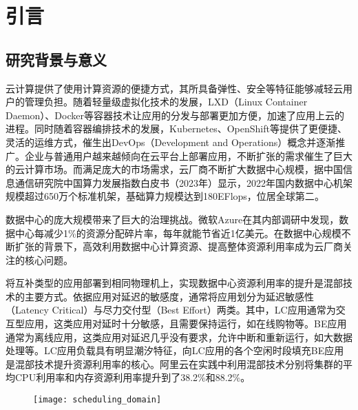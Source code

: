 \chapter{引言}\label{chap:introduction}

\section{研究背景与意义}


云计算提供了使用计算资源的便捷方式，其所具备弹性、安全等特征能够减轻云用户的管理负担。随着轻量级虚拟化技术的发展，LXD（Linux Container Daemon）、Docker等容器技术让应用的分发与部署更加方便，加速了应用上云的进程。同时随着容器编排技术的发展，Kubernetes、OpenShift等提供了更便捷、灵活的运维方式，催生出DevOps（Development and Operations）概念并逐渐推广。企业与普通用户越来越倾向在云平台上部署应用，不断扩张的需求催生了巨大的云计算市场。而满足庞大的市场需求，云厂商不断扩大数据中心规模，据中国信息通信研究院中国算力发展指数白皮书（2023年）显示，2022年国内数据中心机架规模超过650万个标准机架，基础算力规模达到180EFlops，位居全球第二\citep{chinaict2023}。

数据中心的庞大规模带来了巨大的治理挑战。微软Azure在其内部调研中发现，数据中心每减少1\%的资源分配碎片率，每年就能节省近1亿美元\citep{hadary2020protean}。在数据中心规模不断扩张的背景下，高效利用数据中心计算资源、提高整体资源利用率成为云厂商关注的核心问题。

将互补类型的应用部署到相同物理机上，实现数据中心资源利用率的提升是混部技术的主要方式。依据应用对延迟的敏感度，通常将应用划分为延迟敏感性（Latency Critical）与尽力交付型（Best Effort）两类。其中，LC应用通常为交互型应用，这类应用对延时十分敏感，且需要保持运行，如在线购物等。BE应用通常为离线应用，这类应用对延迟几乎没有要求，允许中断和重新运行，如大数据处理等。LC应用负载具有明显潮汐特征，向LC应用的各个空闲时段填充BE应用是混部技术提升资源利用率的核心。阿里云在实践中利用混部技术分别将集群的平均CPU利用率和内存资源利用率提升到了38.2\%和88.2\%\citep{guo2019limits}。

\begin{figure}[!htbp]
    \centering
    \texttt{[image: scheduling\_domain]}
    \label{fig:scheduling_domain}
\end{figure}


